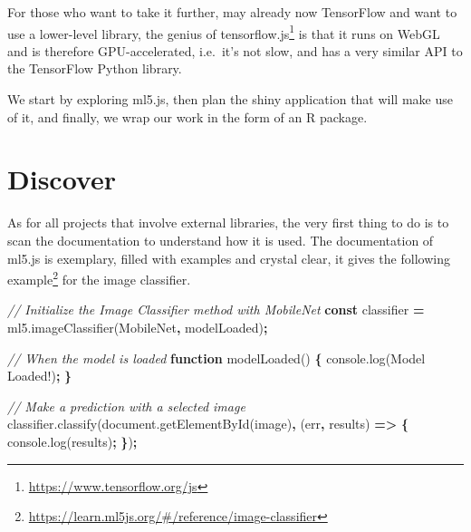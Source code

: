 \documentclass[
]{krantz}
\makeatletter
\newenvironment{Shaded}{\begin{snugshade}}{\end{snugshade}}
\newcommand{\AttributeTok}[1]{\textcolor[rgb]{0.61,0.61,0.61}{#1}}
\newcommand{\CommentTok}[1]{\textcolor[rgb]{0.37,0.37,0.37}{\textit{#1}}}
\newcommand{\KeywordTok}[1]{\textcolor[rgb]{0.27,0.27,0.27}{\textbf{#1}}}
\newcommand{\NormalTok}[1]{#1}
\newcommand{\OperatorTok}[1]{\textcolor[rgb]{0.43,0.43,0.43}{\textbf{#1}}}
\newcommand{\StringTok}[1]{\textcolor[rgb]{0.5,0.5,0.5}{#1}}
\newcommand{\VariableTok}[1]{\textcolor[rgb]{0,0,0}{#1}}
\renewcommand{\href}[2]{#2\footnote{\url{#1}}}
\newenvironment{kframe}{%
\medskip{}
\setlength{\fboxsep}{.8em}
 \def\at@end@of@kframe{}%
 \ifinner\ifhmode%
  \def\at@end@of@kframe{\end{minipage}}%
  \begin{minipage}{\columnwidth}%
 \fi\fi%
 \def\FrameCommand##1{\hskip\@totalleftmargin \hskip-\fboxsep
 \colorbox{shadecolor}{##1}\hskip-\fboxsep
     \hskip-\linewidth \hskip-\@totalleftmargin \hskip\columnwidth}%
 \MakeFramed {\advance\hsize-\width
   \@totalleftmargin\z@ \linewidth\hsize
   \@setminipage}}%
 {\par\unskip\endMakeFramed%
 \at@end@of@kframe}
\renewenvironment{Shaded}{\begin{kframe}}{\end{kframe}}
\makeatother
\begin{document}
For those who want to take it further, may already now TensorFlow and want to use a lower-level library, the genius of \href{https://www.tensorflow.org/js}{tensorflow.js} is that it runs on WebGL and is therefore GPU-accelerated, i.e.~it's not slow, and has a very similar API to the TensorFlow Python library.

We start by exploring ml5.js, then plan the shiny application that will make use of it, and finally, we wrap our work in the form of an R package.

\hypertarget{shiny-complete-discover}{%
\section{Discover}\label{shiny-complete-discover}}

As for all projects that involve external libraries, the very first thing to do is to scan the documentation to understand how it is used. The documentation of ml5.js is exemplary, filled with examples and crystal clear, \href{https://learn.ml5js.org/\#/reference/image-classifier}{it gives the following example} for the image classifier.

\begin{Shaded}
\begin{Highlighting}[]
\CommentTok{// Initialize the Image Classifier method with MobileNet}
\KeywordTok{const}\NormalTok{ classifier }\OperatorTok{=} \VariableTok{ml5}\NormalTok{.}\AttributeTok{imageClassifier}\NormalTok{(}\StringTok{\textquotesingle{}MobileNet\textquotesingle{}}\OperatorTok{,}\NormalTok{ modelLoaded)}\OperatorTok{;}

\CommentTok{// When the model is loaded}
\KeywordTok{function} \AttributeTok{modelLoaded}\NormalTok{() }\OperatorTok{\{}
  \VariableTok{console}\NormalTok{.}\AttributeTok{log}\NormalTok{(}\StringTok{\textquotesingle{}Model Loaded!\textquotesingle{}}\NormalTok{)}\OperatorTok{;}
\OperatorTok{\}}

\CommentTok{// Make a prediction with a selected image}
\VariableTok{classifier}\NormalTok{.}\AttributeTok{classify}\NormalTok{(}\VariableTok{document}\NormalTok{.}\AttributeTok{getElementById}\NormalTok{(}\StringTok{\textquotesingle{}image\textquotesingle{}}\NormalTok{)}\OperatorTok{,}\NormalTok{ (err}\OperatorTok{,}\NormalTok{ results) }\KeywordTok{=>} \OperatorTok{\{}
  \VariableTok{console}\NormalTok{.}\AttributeTok{log}\NormalTok{(results)}\OperatorTok{;}
\OperatorTok{\}}\NormalTok{)}\OperatorTok{;}
\end{Highlighting}
\end{Shaded}
\end{document}

